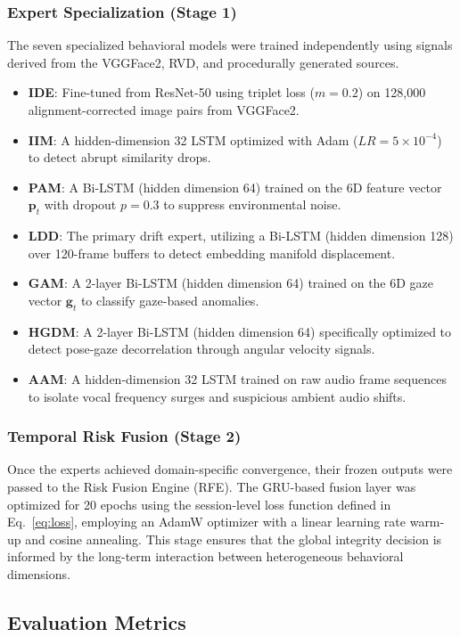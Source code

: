\documentclass[journal]{IEEEtran}
\begin{document}
\subsubsection{Expert Specialization (Stage 1)}
The seven specialized behavioral models were trained independently using signals derived from the VGGFace2, RVD, and procedurally generated sources.
\begin{itemize}
    \item \textbf{IDE}: Fine-tuned from ResNet-50 using triplet loss ($m=0.2$) on 128,000 alignment-corrected image pairs from VGGFace2.
    \item \textbf{IIM}: A hidden-dimension 32 LSTM optimized with Adam ($LR=5{\times}10^{-4}$) to detect abrupt similarity drops.
    \item \textbf{PAM}: A Bi-LSTM (hidden dimension 64) trained on the 6D feature vector $\mathbf{p}_t$ with dropout $p=0.3$ to suppress environmental noise.
    \item \textbf{LDD}: The primary drift expert, utilizing a Bi-LSTM (hidden dimension 128) over 120-frame buffers to detect embedding manifold displacement.
    \item \textbf{GAM}: A 2-layer Bi-LSTM (hidden dimension 64) trained on the 6D gaze vector $\mathbf{g}_t$ to classify gaze-based anomalies.
    \item \textbf{HGDM}: A 2-layer Bi-LSTM (hidden dimension 64) specifically optimized to detect pose-gaze decorrelation through angular velocity signals.
    \item \textbf{AAM}: A hidden-dimension 32 LSTM trained on raw audio frame sequences to isolate vocal frequency surges and suspicious ambient audio shifts.
\end{itemize}

\subsubsection{Temporal Risk Fusion (Stage 2)}
Once the experts achieved domain-specific convergence, their frozen outputs were passed to the Risk Fusion Engine (RFE). The GRU-based fusion layer was optimized for 20 epochs using the session-level loss function defined in Eq.~\ref{eq:loss}, employing an AdamW optimizer with a linear learning rate warm-up and cosine annealing. This stage ensures that the global integrity decision is informed by the long-term interaction between heterogeneous behavioral dimensions.
\subsection{Evaluation Metrics}
\end{document}
